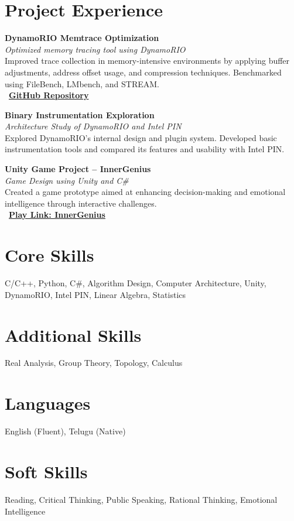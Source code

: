 \documentclass[a4paper,10pt]{article}
\begin{document}
\section*{Project Experience}

\noindent
\textbf{DynamoRIO Memtrace Optimization} \\
\textit{Optimized memory tracing tool using DynamoRIO} \\
Improved trace collection in memory-intensive environments by applying buffer adjustments, address offset usage, and compression techniques. Benchmarked using FileBench, LMbench, and STREAM. \\
\faGithub~\href{https://github.com/GandholiSarat/DynamoRIO-Custom-Client}{\textbf{GitHub Repository}}


\vspace{4pt}

\noindent
\textbf{Binary Instrumentation Exploration} \\
\textit{Architecture Study of DynamoRIO and Intel PIN} \\
Explored DynamoRIO’s internal design and plugin system. Developed basic instrumentation tools and compared its features and usability with Intel PIN.

\vspace{4pt}

\noindent
\textbf{Unity Game Project – InnerGenius} \\
\textit{Game Design using Unity and C\#} \\
Created a game prototype aimed at enhancing decision-making and emotional intelligence through interactive challenges. \\
\faGamepad~\href{https://play.unity.com/en/games/a6df88fa-e4ba-4167-908b-4fd1285dfc5e/innergenius}{\textbf{Play Link: InnerGenius}}

\section*{Core Skills}
C/C++, Python, C\#, Algorithm Design, Computer Architecture, Unity, DynamoRIO, Intel PIN, Linear Algebra, Statistics

\section*{Additional Skills}
Real Analysis, Group Theory, Topology, Calculus

\section*{Languages}
English (Fluent), Telugu (Native)

\section*{Soft Skills}
Reading, Critical Thinking, Public Speaking, Rational Thinking, Emotional Intelligence
\end{document}
